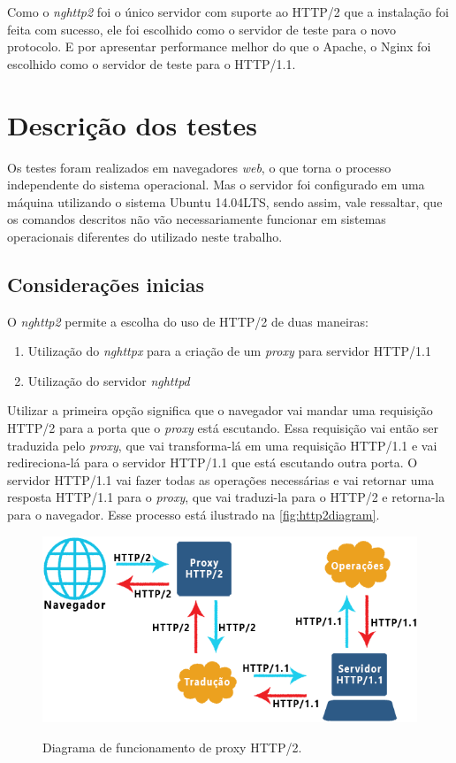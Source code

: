 Como o \textit{nghttp2} foi o único servidor com suporte ao HTTP/2 que a instalação foi feita com sucesso, ele foi escolhido como o servidor de teste para o novo protocolo. E por apresentar performance melhor do que o Apache, o Nginx foi escolhido como o servidor de teste para o HTTP/1.1.


\section{Descrição dos testes}
\label{descricaodostestes}

Os testes foram realizados em navegadores \textit{web}, o que torna o processo independente do sistema operacional. Mas o servidor foi configurado em uma máquina utilizando o sistema Ubuntu 14.04LTS, sendo assim, vale ressaltar, que os comandos descritos não vão necessariamente funcionar em sistemas operacionais diferentes do utilizado neste trabalho.

\subsection{Considerações inicias}
\label{consideracoesiniciais}

O \textit{nghttp2} permite a escolha do uso de HTTP/2 de duas maneiras:
\begin{enumerate}
	\item Utilização do \textit{nghttpx} para a criação de um \textit{proxy} para servidor HTTP/1.1
	\item Utilização do servidor \textit{nghttpd}
\end{enumerate}

Utilizar a primeira opção significa que o navegador vai mandar uma requisição HTTP/2 para a porta que o \textit{proxy} está escutando. Essa requisição vai então ser traduzida pelo \textit{proxy}, que vai transforma-lá em uma requisição HTTP/1.1 e vai redireciona-lá para o servidor HTTP/1.1 que está escutando outra porta. O servidor HTTP/1.1 vai fazer todas as operações necessárias e vai retornar uma resposta HTTP/1.1 para o \textit{proxy}, que vai traduzi-la para o HTTP/2 e retorna-la para o navegador. Esse processo está ilustrado na \autoref{fig:http2diagram}.

\begin{figure}[!htb]
    \centering
    \caption{Diagrama de funcionamento de proxy HTTP/2.}
    \includegraphics[width=1.0\textwidth]{./04-figuras/desenvolvimento/http2_proxy_diagram}
    \label{fig:http2diagram}
\end{figure}

